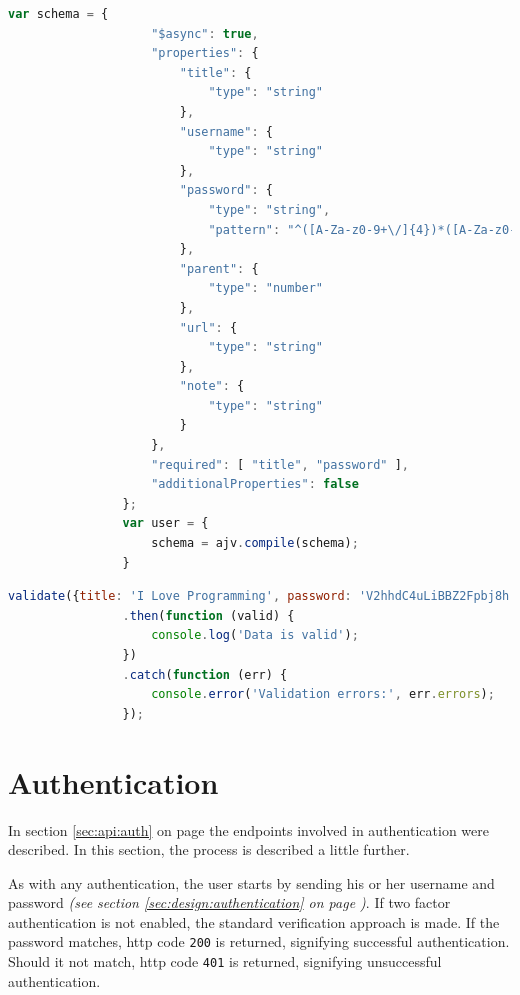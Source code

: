 			\begin{lstlisting}[gobble=16,language=JavaScript,caption={JSON schema for the password model, using Ajv's notation.},label={lst:json:ajv:password},breakatwhitespace=false]
                var schema = {
                    "$async": true,
                    "properties": {
                        "title": {
                            "type": "string"
                        },
                        "username": {
                            "type": "string"
                        },
                        "password": {
                            "type": "string",
                            "pattern": "^([A-Za-z0-9+\/]{4})*([A-Za-z0-9+\/]{4}|[A-Za-z0-9+\/]{3}=|[A-Za-z0-9+\/]{2}==)$"
                        },
                        "parent": {
                            "type": "number"
                        },
                        "url": {
                            "type": "string"
                        },
                        "note": {
                            "type": "string"
                        }
                    },
                    "required": [ "title", "password" ],
                    "additionalProperties": false
                };
                var user = {
                    schema = ajv.compile(schema);
                }
				\end{lstlisting}

			\begin{lstlisting}[gobble=16,language=JavaScript,caption={Using the user schema for validating input, using Ajv.},label={lst:json:ajv:password:use}]
                validate({title: 'I Love Programming', password: 'V2hhdC4uLiBBZ2Fpbj8h'))
                .then(function (valid) {
                    console.log('Data is valid');
                })
                .catch(function (err) {
                    console.error('Validation errors:', err.errors);
                });
		\end{lstlisting}

	\section{Authentication}
		\label{sec:impl:authentication}
		In section \ref{sec:api:auth} on page \pageref{sec:api:auth} the endpoints involved in authentication were described. In this section, the process is described a little further. 

		As with any authentication, the user starts by sending his or her username and password \emph{(see section \ref{sec:design:authentication} on page \pageref{sec:design:authentication})}. If two factor authentication is not enabled, the standard verification approach is made. If the password matches, http code \verb=200= is returned, signifying successful authentication. Should it not match, http code \verb=401= is returned, signifying unsuccessful authentication.

